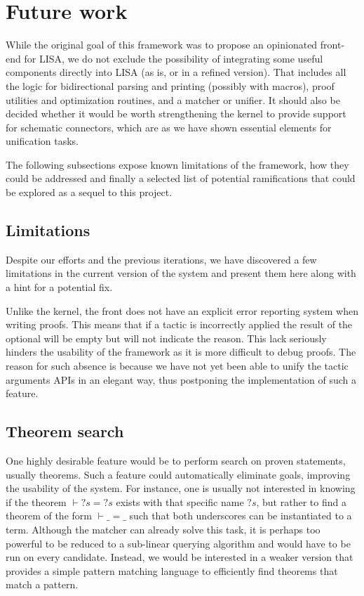 \section{Future work}
\label{sec:future-work}

While the original goal of this framework was to propose an opinionated front-end for LISA, we do not exclude the possibility of integrating some useful components directly into LISA (as is, or in a refined version). That includes all the logic for bidirectional parsing and printing (possibly with macros), proof utilities and optimization routines, and a matcher or unifier. It should also be decided whether it would be worth strengthening the kernel to provide support for schematic connectors, which are as we have shown essential elements for unification tasks.

The following subsections expose known limitations of the framework, how they could be addressed and finally a selected list of potential ramifications that could be explored as a sequel to this project.

\subsection{Limitations}

Despite our efforts and the previous iterations, we have discovered a few limitations in the current version of the system and present them here along with a hint for a potential fix.

Unlike the kernel, the front does not have an explicit error reporting system when writing proofs. This means that if a tactic is incorrectly applied the result of the optional will be empty but will not indicate the reason. This lack seriously hinders the usability of the framework as it is more difficult to debug proofs. The reason for such absence is because we have not yet been able to unify the tactic arguments APIs in an elegant way, thus postponing the implementation of such a feature.



% 

\subsection{Theorem search}

One highly desirable feature would be to perform search on proven statements, usually theorems. Such a feature could automatically eliminate goals, improving the usability of the system. For instance, one is usually not interested in knowing if the theorem $\vdash {?s} = {?s}$ exists with that specific name ${?s}$, but rather to find a theorem of the form $\vdash \_ = \_$ such that both underscores can be instantiated to a term. Although the matcher can already solve this task, it is perhaps too powerful to be reduced to a sub-linear querying algorithm and would have to be run on every candidate. Instead, we would be interested in a weaker version that provides a simple pattern matching language to efficiently find theorems that match a pattern.
